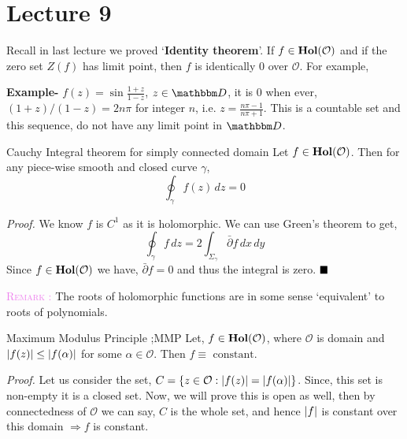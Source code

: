\documentclass[../ComplexAnalysis_Notes.tex]{subfiles}
\begin{document}
\chapter*{Lecture 9} %
\setcounter{chapter}{9} %
\setcounter{section}{0}
\setcounter{equation}{0}
\setcounter{figure}{0}

Recall in last lecture we proved `\textbf{Identity theorem}'. If $f \in \operatorname{\mathbf{Hol}}(\mathcal{O})$ and if the zero set $Z(f)$ has limit point, then $f$ is identically $0$ over $\mathcal{O}$. For example, 

\vspace*{0.2cm}

\noindent \textbf{Example-} $f(z) = \sin \frac{1+z}{1-z}$, $z \in \bb{D}$, it is $0$ when ever, $(1+z)/(1-z) = 2n \pi$ for integer $n$, i.e. $z = \frac{n\pi -1}{n \pi +1}$. This is a countable set and this sequence, do not have any limit point in $\bb{D}$. 

\begin{Thm}{Cauchy Integral theorem for simply connected domain}{}
    Let $f \in \operatorname{\mathbf{Hol}} (\mathcal{O})$. Then for any piece-wise smooth and closed curve $\gamma$, $$\oint_{\gamma}f(z) \, dz =0$$
\end{Thm}

\noindent \textit{Proof.} We know $f$ is $C^1$ as it is holomorphic. We can use Green's theorem to get, $$\oint_{\gamma}f\, dz = 2 \int_{\Sigma_{\gamma}} \bar{\partial}f \, dx \, dy$$  Since $f \in \operatorname{\mathbf{Hol}} (\mathcal{O})$ we have, $\bar{\partial}f =0$ and thus the integral is zero. $\hfill \blacksquare$



 \textcolor{violet}{\textsc{Remark :}} The roots of holomorphic functions are in some sense `equivalent' to roots of polynomials.

 \begin{Thm}{Maximum Modulus Principle ;MMP}{}
   Let, $f \in \operatorname{\mathbf{Hol}}(\mathcal{O})$, where $\mathcal{O}$ is domain and $\abs{f(z)} \leq \abs{f(\alpha)}$ for some $\alpha \in \mathcal{O}$. Then $f \equiv \text{ constant}$.
 \end{Thm}

 \noindent \textit{Proof.} Let us consider the set, $C = \qty{z \in \mathcal{O} : \abs{f(z)}=\abs{f(\alpha)}}$. Since, this set is non-empty it is a closed set. Now, we will prove this is open as well, then by connectedness of $\mathcal{O}$ we can say, $C$ is the whole set, and hence $\abs{f}$ is constant over this domain $\Rightarrow f$ is constant.
\end{document}

